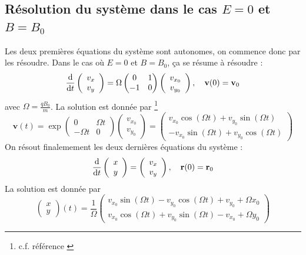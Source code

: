 \documentclass[a4paper,12pt,oneside]{article}
\def \be {\begin{equation}}
\def \ee {\end{equation}}
\def \dd  {{\rm d}}
\begin{document}
\subsection{Résolution du système dans le cas $E=0$ et $B=B_0$}
Les deux premières équations du système sont autonomes, on commence donc par les résoudre. Dans le cas où $E=0$ et $B=B_0$, ça se résume à résoudre :
\be
\frac{\dd }{\dd t} 
\left( \begin{array}{c} v_x \\ v_y \end{array} \right)
=
\Omega
\left( \begin{matrix}
 0 & 1 \\
 -1 & 0
\end{matrix} \right)
\left( \begin{array}{c}
   v_{x_0} \\ v_{y_0}
\end{array} \right), \quad
\textbf{v}(0) = \textbf{v}_0
\ee
avec $\Omega=\frac{qB_0}{m}$.
La solution est donnée par \footnote{c.f. référence \cite{stubbe}} 
\be
\textbf{v}(t)=\exp\left( \begin{matrix}
 0 & \Omega t \\
 -\Omega t & 0
\end{matrix} \right) 
\left( \begin{array}{c}
   v_{x_0} \\ v_{y_0}
\end{array} \right)
=
\left( \begin{array}{c}
   v_{x_0}  \cos (\Omega t) + v_{y_0} \sin (\Omega t) \\
   -v_{x_0} \sin (\Omega t) + v_{y_0} \cos (\Omega t)
\end{array} \right)
\ee
On résout finalemement les deux dernières équations du système :
\be
\frac{\dd }{\dd t} 
\left( \begin{array}{c} x \\ y \end{array} \right)
=
\left( \begin{array}{c} v_x \\ v_y \end{array} \right) , \quad
\textbf{r}(0)=\textbf{r}_0
\ee
La solution est donnée par 
\be \label{equaMvmt}
\left( \begin{array}{c} x \\ y \end{array} \right) (t)
=
\frac{1}{\Omega} \left( \begin{array}{c}
   v_{x_0}  \sin (\Omega t) - v_{y_0} \cos (\Omega t) + v_{y_0} + \Omega x_0 \\
   v_{x_0} \cos (\Omega t) + v_{y_0} \sin (\Omega t) - v_{x_0} + \Omega y_0
\end{array} \right) 
\ee
\end{document}
